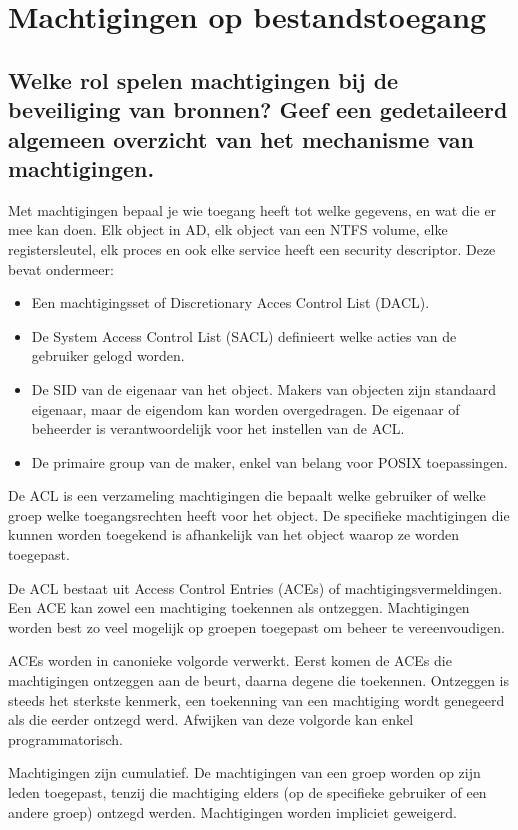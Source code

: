 \chapter{Machtigingen op bestandstoegang}

\section{Welke rol spelen machtigingen bij de beveiliging van bronnen? Geef een
gedetaileerd algemeen overzicht van het mechanisme van machtigingen.}

Met machtigingen bepaal je wie toegang heeft tot welke gegevens, en wat die er
mee kan doen. Elk object in AD, elk object van een NTFS volume, elke
registersleutel, elk proces en ook elke service heeft een security descriptor.
Deze bevat ondermeer:
\begin{itemize}
	\item Een machtigingsset of Discretionary Acces Control List (DACL).
	\item De System Access Control List (SACL) definieert welke acties van
		de gebruiker gelogd worden.
	\item De SID van de eigenaar van het object. Makers van objecten zijn
		standaard eigenaar, maar de eigendom kan worden overgedragen. De
		eigenaar of beheerder is verantwoordelijk voor het instellen van
		de ACL.
	\item De primaire group van de maker, enkel van belang voor POSIX
		toepassingen.
\end{itemize}

De ACL is een verzameling machtigingen die bepaalt welke gebruiker of welke
groep welke toegangsrechten heeft voor het object. De specifieke machtigingen
die kunnen worden toegekend is afhankelijk van het object waarop ze worden
toegepast.

De ACL bestaat uit Access Control Entries (ACEs) of machtigingsvermeldingen. Een
ACE kan zowel een machtiging toekennen als ontzeggen. Machtigingen worden best
zo veel mogelijk op groepen toegepast om beheer te vereenvoudigen.

ACEs worden in canonieke volgorde verwerkt. Eerst komen de ACEs die machtigingen
ontzeggen aan de beurt, daarna degene die toekennen. Ontzeggen is steeds het
sterkste kenmerk, een toekenning van een machtiging wordt genegeerd als die
eerder ontzegd werd. Afwijken van deze volgorde kan enkel programmatorisch.

Machtigingen zijn cumulatief. De machtigingen van een groep worden op zijn leden
toegepast, tenzij die machtiging elders (op de specifieke gebruiker of een
andere groep) ontzegd werden. Machtigingen worden impliciet geweigerd.


